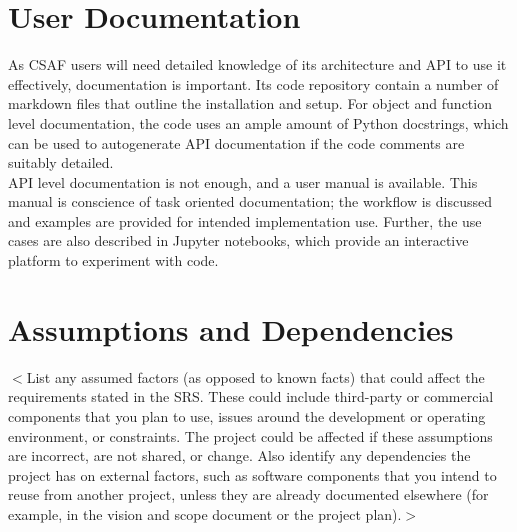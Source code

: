 \section{User Documentation}

As CSAF users will need detailed knowledge of its architecture and API to use it effectively, documentation is important. Its code repository contain a number of markdown files that outline the installation and setup. For object and function level documentation, the code uses an ample amount of Python docstrings, which can be used to autogenerate API documentation if the code comments are suitably detailed. \\

API level documentation is not enough, and  a user manual is available. This manual is conscience of task oriented documentation; the workflow is discussed and examples are provided for intended implementation use. Further, the use cases are also described in Jupyter notebooks, which provide an interactive platform to experiment with code.

\section{Assumptions and Dependencies}

$<$List any assumed factors (as opposed to known facts) that could affect the 
requirements stated in the SRS. These could include third-party or commercial 
components that you plan to use, issues around the development or operating 
environment, or constraints. The project could be affected if these assumptions 
are incorrect, are not shared, or change. Also identify any dependencies the 
project has on external factors, such as software components that you intend to 
reuse from another project, unless they are already documented elsewhere (for 
example, in the vision and scope document or the project plan).$>$
